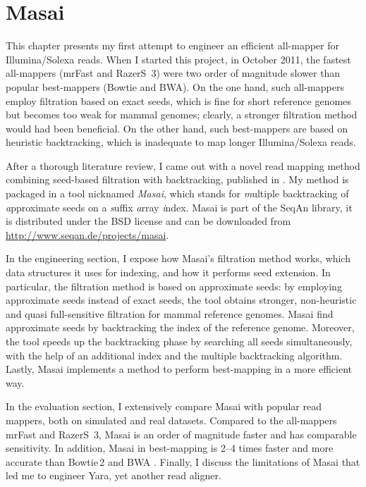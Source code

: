 \chapter{Masai}
\label{sec:masai}

This chapter presents my first attempt to engineer an efficient all-mapper for Illumina/Solexa reads.
When I started this project, in October 2011, the fastest all-mappers (mrFast and RazerS~3) were two order of magnitude slower than popular best-mappers (Bowtie and BWA).
On the one hand, such all-mappers employ filtration based on exact seeds, which is fine for short reference genomes but becomes too weak for mammal genomes; clearly, a stronger filtration method would had been beneficial.
On the other hand, such best-mappers are based on heuristic backtracking, which is inadequate to map longer Illumina/Solexa reads.

After a thorough literature review, I came out with a novel read mapping method combining seed-based filtration with backtracking, published in \citep{Siragusa2013}.
My method is packaged in a \CC tool nicknamed \emph{Masai}, which stands for \emph{m}ultiple backtracking of \emph{a}pproximate seeds on a \emph{s}uffix \emph{a}rray \emph{i}ndex.
Masai is part of the SeqAn library, it is distributed under the BSD license and can be downloaded from \url{http://www.seqan.de/projects/masai}.

In the engineering section, I expose how Masai's filtration method works, which data structures it uses for indexing, and how it performs seed extension.
In particular, the filtration method is based on approximate seeds: by employing approximate seeds instead of exact seeds, the tool obtains stronger, non-heuristic and quasi full-sensitive filtration for mammal reference genomes.
Masai find approximate seeds by backtracking the index of the reference genome.
Moreover, the tool speeds up the backtracking phase by searching all seeds simultaneously, with the help of an additional index and the multiple backtracking algorithm.
Lastly, Masai implements a method to perform best-mapping in a more efficient way.

In the evaluation section, I extensively compare Masai with popular read mappers, both on simulated and real datasets.
Compared to the all-mappers mrFast and RazerS~3, Masai is an order of magnitude faster and has comparable sensitivity.
In addition, Masai in best-mapping is 2--4 times faster and more accurate than Bowtie\,2 \citep{Langmead2012} and BWA \citep{Li2009}.
Finally, I discuss the limitations of Masai that led me to engineer Yara, yet another read aligner.

